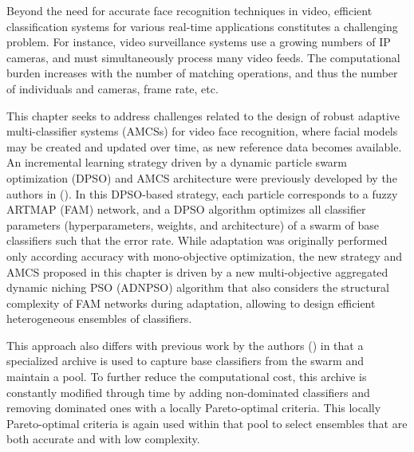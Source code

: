 Beyond the need for accurate face recognition techniques in video, efficient classification systems for various real-time applications constitutes a challenging problem.
For instance, video surveillance systems use a growing numbers of IP cameras, and must simultaneously process many video feeds.
The computational burden increases with the number of matching operations, and thus the number of individuals and cameras, frame rate, etc.  

This chapter seeks to address challenges related to the design of robust adaptive multi-classifier systems (AMCSs) for video face recognition, where facial models may be created and updated over time, as new reference data becomes available.
An incremental learning strategy driven by a dynamic particle swarm optimization (DPSO) and AMCS architecture were previously developed by the authors in (\cite{connolly11}).
In this DPSO-based strategy, each particle corresponds to a fuzzy ARTMAP (FAM) network, and a DPSO algorithm optimizes all classifier parameters (hyperparameters, weights, and architecture) of a swarm of base classifiers such that the error rate.
While adaptation was originally performed only according accuracy with mono-objective optimization, the new strategy and AMCS proposed in this chapter is driven by a new multi-objective aggregated dynamic niching PSO (ADNPSO) algorithm that also considers the structural complexity of FAM networks during adaptation, allowing to design efficient heterogeneous ensembles of classifiers.

This approach also differs with previous work by the authors (\cite{connolly11}) in that a specialized archive is used to capture base classifiers from the swarm and maintain a pool.
To further reduce the computational cost, this archive is constantly modified through time by adding non-dominated classifiers and removing dominated ones with a locally Pareto-optimal criteria.
This locally Pareto-optimal criteria is again used within that pool to select ensembles that are both accurate and with low complexity.

